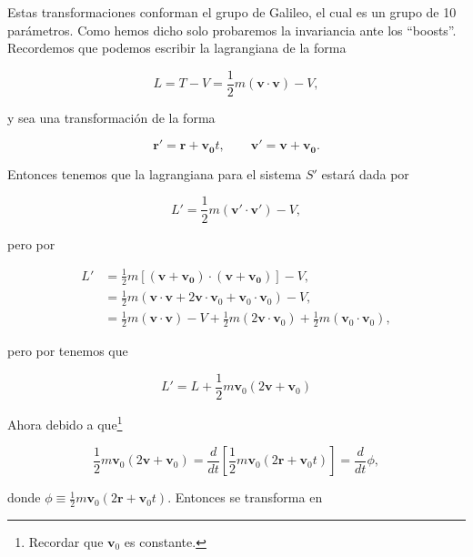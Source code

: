 \documentclass[a4paper,10pt]{article}
\numberwithin{equation}{section}
\begin{document}
Estas transformaciones conforman el grupo de Galileo, el cual es un grupo de 10 parámetros. 
Como hemos dicho solo probaremos la invariancia ante los ``boosts''. Recordemos que podemos 
escribir la lagrangiana de la forma

\begin{equation}
 L = T-V = \frac{1}{2}m(\mathbf{v}\cdot \mathbf{v}) - V,
 \label{eq:lagrangianaGalileo1}
\end{equation}

y sea una transformación de la forma

\begin{equation}
 \mathbf{r}' = \mathbf{r} + \mathbf{v_0}t, \qquad \mathbf{v}' = \mathbf{v} + \mathbf{v_0}.
\label{eq:boost1}
\end{equation}

Entonces tenemos que la lagrangiana para el sistema $S'$ estará dada por

\begin{equation}
 L' = \frac{1}{2}m(\mathbf{v}'\cdot \mathbf{v}') - V,
\end{equation}

pero por  

\begin{align*}
 L'&= \frac{1}{2}m[(\mathbf{v} + \mathbf{v_0})\cdot(\mathbf{v} + \mathbf{v_0})] - V, \\
   &= \frac{1}{2}m(\mathbf{v}\cdot \mathbf{v} + 2\mathbf{v}\cdot \mathbf{v}_0 + \mathbf{v}_0\cdot \mathbf{v}_0) - V, \\
   &= \frac{1}{2}m(\mathbf{v}\cdot \mathbf{v}) - V + \frac{1}{2}m(2\mathbf{v}\cdot \mathbf{v}_0) + \frac{1}{2}m(\mathbf{v}_0\cdot \mathbf{v}_0),
\end{align*}

pero por  tenemos que 

\begin{equation}
 L' = L + \frac{1}{2}m\mathbf{v}_0(2\mathbf{v}+\mathbf{v}_0)
 \label{eq:lagrangianaGalileo2}
\end{equation}

Ahora debido a que\footnote{Recordar que $\mathbf{v}_0$ es constante.}

\begin{equation}
 \frac{1}{2}m\mathbf{v}_0(2\mathbf{v}+\mathbf{v}_0) = \frac{d}{dt}\left[\frac{1}{2}m\mathbf{v}_0(2\mathbf{r}+\mathbf{v}_0t)\right]
 = \frac{d}{dt}\phi,
\end{equation}

donde $\phi \equiv \frac{1}{2}m\mathbf{v}_0(2\mathbf{r}+\mathbf{v}_0t)$. Entonces 
 se transforma en 
\end{document}
